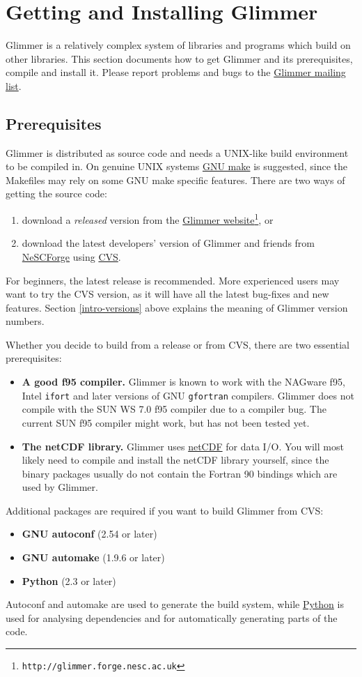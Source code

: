 \section{Getting and Installing Glimmer}
Glimmer is a relatively complex system of libraries and programs which
build on other libraries. This section documents how to get Glimmer
and its prerequisites, compile and install it. Please report problems
and bugs to the
\href{http://forge.nesc.ac.uk/mailman/listinfo/glimmer-discuss}{Glimmer
  mailing list}.
%
\subsection{Prerequisites}
\label{ug.sec.prereqs}
Glimmer is distributed as source code and needs a UNIX-like build
environment to be compiled in. On genuine UNIX systems
\href{http://www.gnu.org/software/make/}{GNU make} is suggested, since
the Makefiles may rely on some GNU make specific features. There are
two ways of getting the source code:
%
\begin{enumerate}
\item download a {\it released} version from the
  \href{http://glimmer.forge.nesc.ac.uk}{Glimmer
    website}\footnote{\texttt{http://glimmer.forge.nesc.ac.uk}}, or 
\item download the latest developers' version of Glimmer and friends
  from \href{http://forge.nesc.ac.uk/}{NeSCForge} using
  \href{http://www.gnu.org/software/cvs/}{CVS}. 
\end{enumerate}
%
For beginners, the latest release is recommended. More experienced
users may want to try the CVS version, as it will have all the latest
bug-fixes and new features. Section \ref{intro-versions} above
explains the meaning of Glimmer version numbers.

Whether you decide to build from a release or from CVS, there are two
essential prerequisites:
%
\begin{itemize}
\item {\bf A good f95 compiler.} Glimmer is known to
work with the NAGware f95, Intel \texttt{ifort} and later versions of GNU
\texttt{gfortran} compilers. Glimmer does not compile with the SUN WS 7.0 f95
compiler due to a compiler bug. The current SUN f95 compiler might
work, but has not been tested yet. 
\item {\bf The netCDF library.} Glimmer uses
  \href{http://www.unidata.ucar.edu/packages/netcdf/index.html}{netCDF}
  for data I/O. You will most likely need to compile and install the
  netCDF library yourself, since the binary packages usually do not
  contain the Fortran 90 bindings which are used by Glimmer. 
\end{itemize}
%
Additional packages are required if you want to build Glimmer from
CVS:
%
\begin{itemize}
\item{{\bf GNU autoconf} (2.54 or later)}
\item{{\bf GNU automake} (1.9.6 or later)}
\item{{\bf Python} (2.3 or later)}
\end{itemize}
%
Autoconf and automake are used to generate the build system,
while \href{http://www.python.org}{Python} is used for
analysing dependencies and for automatically generating parts of the
code.
%
